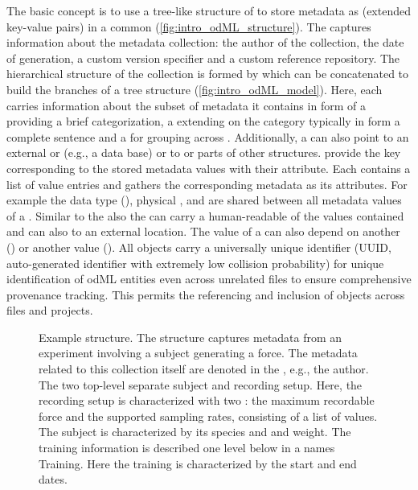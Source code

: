 The basic concept is to use a tree-like structure of  to store metadata as  (extended key-value pairs) in a common  (\cref{fig:intro_odML_structure}). The  captures information about the metadata collection: the author of the collection, the date of generation, a custom version specifier and a custom reference repository. The hierarchical structure of the collection is formed by  which can be concatenated to build the branches of a tree structure (\cref{fig:intro_odML_model}). Here, each  carries information about the subset of metadata it contains in form of a   providing a brief categorization, a  extending on the category typically in form a complete sentence and a  for grouping across . Additionally, a  can also point to an external  or  (e.g., a data base) or  to or  parts of other  structures.  provide  the key corresponding to the stored metadata values with their  attribute. Each  contains a list of value entries and gathers the corresponding metadata as its  attributes. For example the data type (), physical ,  and  are shared between all metadata values of a . Similar to the  also the  can carry a human-readable  of the values contained and can also  to an external location. The value of a  can also depend on another  () or another  value (). All  objects carry a universally unique identifier (UUID, auto-generated identifier with extremely low collision probability) for unique identification of odML entities even across unrelated files to ensure comprehensive provenance tracking. This permits the referencing and inclusion of  objects across files and projects.\\



\begin{figure}[hp]
 \centering
 \scalebox{0.45}{
 }
 \caption[Example  structure]{Example  structure. The  structure captures metadata from an experiment involving a subject generating a force. The metadata related to this collection itself are denoted in the  , e.g., the author. The two top-level  separate subject and recording setup. Here, the recording setup is characterized with two : the maximum recordable force and the supported sampling rates, consisting of a list of values. The subject is characterized by its species and and weight. The training information is described one level below in a  names Training. Here the training is characterized by the start and end dates.}
 \label{fig:intro_example_odml_structure}
\end{figure}

